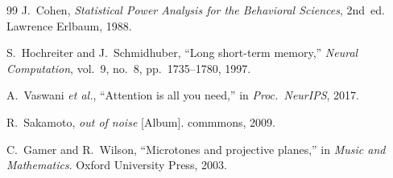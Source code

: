 \documentclass[conference,10pt,a4paper]{IEEEtran}
\begin{document}
\begin{thebibliography}{99}
J.~Cohen, \emph{Statistical Power Analysis for the Behavioral Sciences},
2nd~ed. Lawrence Erlbaum, 1988.

S.~Hochreiter and J.~Schmidhuber, ``Long short-term memory,''
\emph{Neural Computation}, vol.~9, no.~8, pp.~1735--1780, 1997.

A.~Vaswani \emph{et al.}, ``Attention is all you need,'' in
\emph{Proc.\ NeurIPS}, 2017.

R.~Sakamoto, \emph{out of noise} [Album]. commmons, 2009.

C.~Gamer and R.~Wilson, ``Microtones and projective planes,'' in
\emph{Music and Mathematics}. Oxford University Press, 2003.

\end{thebibliography}
\end{document}
